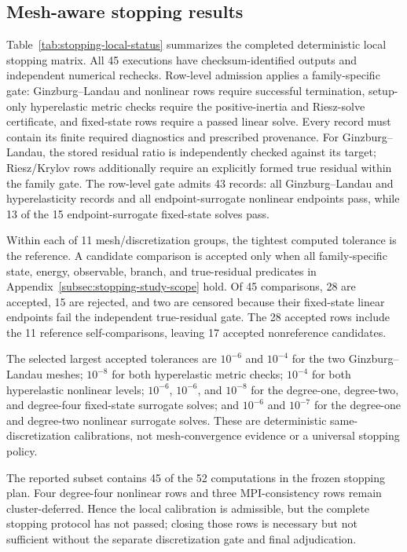 \subsection{Mesh-aware stopping results}
\label{subsec:stopping-results}

Table~\ref{tab:stopping-local-status} summarizes the completed deterministic
local stopping matrix. All 45 executions have checksum-identified outputs and
independent numerical rechecks. Row-level admission applies a family-specific
gate: Ginzburg--Landau and nonlinear rows require successful termination,
setup-only hyperelastic metric checks require the positive-inertia and
Riesz-solve certificate, and fixed-state rows require a passed linear solve.
Every record must contain its finite required diagnostics and prescribed
provenance. For Ginzburg--Landau, the stored residual ratio is independently
checked against its target; Riesz/Krylov rows additionally require an
explicitly formed true residual within the family gate. The row-level gate
admits 43 records: all Ginzburg--Landau and hyperelasticity records and all
endpoint-surrogate nonlinear endpoints pass, while 13 of the 15
endpoint-surrogate fixed-state solves pass.

Within each of 11 mesh/discretization groups, the tightest computed tolerance
is the reference. A candidate comparison is accepted only when all
family-specific state, energy, observable, branch, and true-residual predicates
in Appendix~\ref{subsec:stopping-study-scope} hold. Of 45 comparisons, 28 are
accepted, 15 are rejected, and two are censored because their fixed-state
linear endpoints fail the independent true-residual gate. The 28 accepted rows
include the 11 reference self-comparisons, leaving 17 accepted nonreference
candidates.

{

}

The selected largest accepted tolerances are $10^{-6}$ and $10^{-4}$ for the
two Ginzburg--Landau meshes; $10^{-8}$ for both hyperelastic metric checks;
$10^{-4}$ for both hyperelastic nonlinear levels; $10^{-6}$, $10^{-6}$, and
$10^{-8}$ for the degree-one, degree-two, and degree-four fixed-state
surrogate solves; and $10^{-6}$ and $10^{-7}$ for the degree-one and
degree-two nonlinear surrogate solves. These are deterministic
same-discretization calibrations, not mesh-convergence evidence or a universal
stopping policy.

The reported subset contains 45 of the 52 computations in the frozen stopping
plan. Four degree-four nonlinear rows and three MPI-consistency rows remain
cluster-deferred. Hence the local calibration is admissible, but the complete
stopping protocol has not passed; closing those rows is necessary but not
sufficient without the separate discretization gate and final adjudication.


